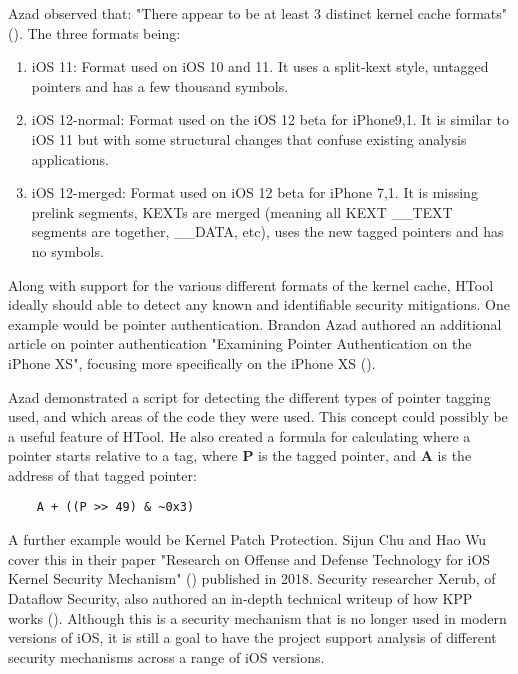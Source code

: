 Azad observed that: "There appear to be at least 3 distinct kernel cache formats" (\cite{azad-tagged-pointers}). The three formats being:

\begin{enumerate}
	\item iOS 11: Format used on iOS 10 and 11. It uses a split-kext style, untagged pointers and has a few thousand symbols.
	\item iOS 12-normal: Format used on the iOS 12 beta for iPhone9,1. It is similar to iOS 11 but with some structural changes that confuse existing analysis applications.
	\item iOS 12-merged: Format used on iOS 12 beta for iPhone 7,1. It is missing prelink segments, KEXTs are merged (meaning all KEXT \_\_TEXT segments are together, \_\_DATA, etc), uses the new tagged pointers and has no symbols.
\end{enumerate}



Along with support for the various different formats of the kernel cache, HTool ideally should able to detect any known and identifiable security mitigations. One example would be pointer authentication. Brandon Azad authored an additional article on pointer authentication "Examining Pointer Authentication on the iPhone XS", focusing more specifically on the iPhone XS (\cite{azad-pac-indepth}).

Azad demonstrated a script for detecting the different types of pointer tagging used, and which areas of the code they were used. This concept could possibly be a useful feature of HTool. He also created a formula for calculating where a pointer starts relative to a tag, where \textbf{P} is the tagged pointer, and \textbf{A} is the address of that tagged pointer:

 \begin{verbatim}
 	A + ((P >> 49) & ~0x3)
 \end{verbatim}
 
 A further example would be Kernel Patch Protection. Sijun Chu and Hao Wu cover this in their paper "Research on Offense and Defense Technology for iOS Kernel Security Mechanism" (\cite{sijun-kernel-paper}) published in 2018. Security researcher Xerub, of Dataflow Security, also authored an in-depth technical writeup of how KPP works (\cite{xerub-tick-tock}). Although this is a security mechanism that is no longer used in modern versions of iOS, it is still a goal to have the project support analysis of different security mechanisms across a range of iOS versions.
 

